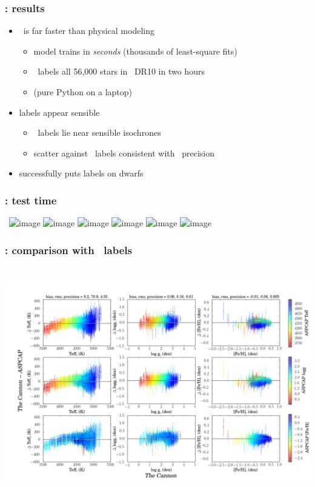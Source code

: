 \documentclass[pdftex]{beamer}
\begin{document}
\newcommand{\results}{%
\begin{frame}
  \frametitle{\tc: results}
  \begin{itemize}
  \item \tc\ is far faster than physical modeling
    \begin{itemize}
    \item model trains in \emph{seconds} (thousands of least-square fits)
    \item \tc\ labels all 56,000 stars in \apogee\ DR10 in two hours
    \item (pure Python on a laptop)
    \end{itemize}
  \item labels appear sensible
    \begin{itemize}
    \item \tc\ labels lie near sensible isochrones
    \item scatter against \apogee\ labels consistent with \apogee\ precision
    \end{itemize}
  \item successfully puts labels on dwarfs
  \end{itemize}
\end{frame}}

\results

\begin{frame}
  \frametitle{\tc: test time}
  ~\hfill\includegraphics<1>[height=\figureheight]{../documents/plots/4431_v19.png}
         \includegraphics<2>[height=\figureheight]{../documents/plots/4383_v19.png}
         \includegraphics<3>[height=\figureheight]{../documents/plots/4399_v19.png}
         \includegraphics<4>[height=\figureheight]{../documents/plots/4309_v19.png}
         \includegraphics<5>[height=\figureheight]{../documents/plots/4311_v19.png}
         \includegraphics<6>[height=\figureheight]{../documents/plots/4255_v19.png} 
\end{frame}

\begin{frame}
  \frametitle{\tc: comparison with \apogee\ labels}
  ~\hfill\includegraphics[height=\figureheight]{../documents/plots/cplot2.png} 
\end{frame}
\end{document}
